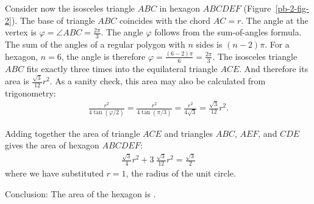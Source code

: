 Consider now the isosceles triangle $ABC$ in hexagon $ABCDEF$ (Figure~\ref{pb-2-fig-2}). The base of triangle $ABC$ coincides with the chord $AC=r$. The angle at the vertex is $\varphi={\angle}ABC=\frac{2\pi}{3}$. The angle $\varphi$ follows from the sum-of-angles formula. The sum of the angles of a regular polygon with $n$ sides is $(n-2)\pi$. For a hexagon, $n=6$, the angle is therefore $\varphi=\frac{(6-2)\pi}{6}=\frac{2\pi}{3}$. The isosceles triangle $ABC$ fits exactly three times into the equilateral triangle $ACE$. And therefore its area is $\frac{\sqrt{3}}{12}r^{2}$. As a sanity check, this area may also be calculated from trigonometry:
\begin{align*}
\frac{r^{2}}{4\tan(\varphi/2)}
= \frac{r^{2}}{4\tan(\pi/3)}
= \frac{r^{2}}{4\sqrt{3}}
= \frac{\sqrt{3}}{12}r^{2}.
\end{align*}

Adding together the area of triangle $ACE$ and triangles $ABC$, $AEF$, and $CDE$ gives the area of hexagon $ABCDEF$:
\begin{align*}
\frac{\sqrt{3}}{4}r^{2}
+ 3 \ \frac{\sqrt{3}}{12} r^{2}
= \frac{\sqrt{3}}{2}
\end{align*}
where we have substituted $r=1$, the radius of the unit circle.

Conclusion: The area of the hexagon is .

